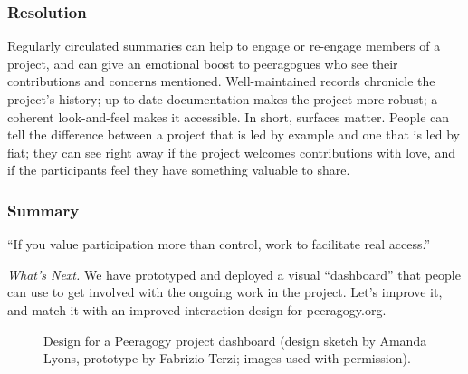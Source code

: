 \subsubsection*{Resolution} 
Regularly circulated summaries can help to engage or re-engage members of a project, and can give an emotional boost to peeragogues who see their contributions and concerns mentioned.  Well-maintained records chronicle the project's history; up-to-date documentation makes the project more robust; a coherent look-and-feel makes it accessible.
%
In short, surfaces matter.  People can tell the difference between a project that is led by example and one that is led by fiat;
they can see right away if the project welcomes contributions with love, and if the participants feel they have something valuable to share.

\subsubsection*{Summary}
``If you value participation more than control, work to facilitate real access.''


\begin{framed}
\noindent 
\emph{What's Next.}
We have prototyped and deployed a visual ``dashboard'' that people can use to get involved with the ongoing work in the project.  Let's improve it, and match it with an improved interaction design for peeragogy.org.
\end{framed}    


\begin{figure}
\caption{Design for a Peeragogy project dashboard (design sketch by Amanda Lyons, prototype by Fabrizio Terzi; images used with permission).\label{dashboard}}
\end{figure}

